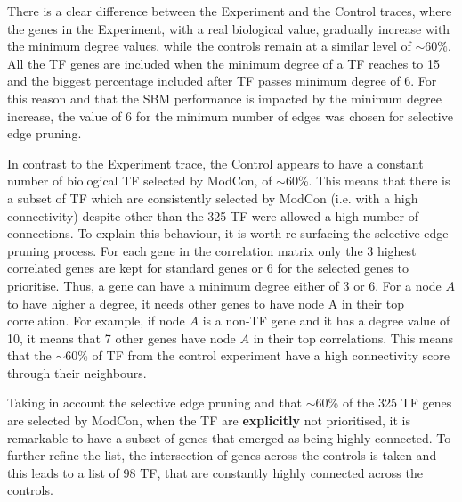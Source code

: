 There is a clear difference between the Experiment and the Control traces, where the genes in the Experiment, with a real biological value, gradually increase with the minimum degree values, while the controls remain at a similar level of $\sim60\%$. All the TF genes are included when the minimum degree of a TF reaches to 15 and the biggest percentage included after TF passes minimum degree of 6. For this reason and that the SBM performance is impacted by the minimum degree increase, the value of 6 for the minimum number of edges was chosen for selective edge pruning.


In contrast to the Experiment trace, the Control appears to have a constant number of biological TF selected by ModCon, of $\sim$60\%. This means that there is a subset of TF which are consistently selected by ModCon (i.e. with a high connectivity) despite other than the 325 TF were allowed a high number of connections. To explain this behaviour, it is worth re-surfacing the selective edge pruning process. For each gene in the correlation matrix only the 3 highest correlated genes are kept for standard genes or 6 for the selected genes to prioritise. Thus, a gene can have a minimum degree either of 3 or 6. For a node $A$ to have higher a degree, it needs other genes to have node A in their top correlation. For example, if node $A$ is a non-TF gene and it has a degree value of 10, it means that 7 other genes have node $A$ in their top correlations. This means that the  $\sim$60\% of TF from the control experiment have a high connectivity score through their neighbours.

Taking in account the selective edge pruning and that $\sim$60\% of the 325 TF genes are selected by ModCon, when the TF are \textbf{explicitly} not prioritised, it is remarkable to have a subset of genes that emerged as being highly connected. To further refine the list, the intersection of genes across the controls is taken and this leads to a list of 98 TF, that are constantly highly connected across the controls. 

